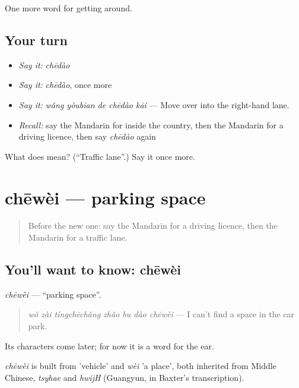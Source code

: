 \begin{grammarlens}[title={What you've built}]
One more word for getting around.
\end{grammarlens}

\subsection*{Your turn}
\begin{itemize}
\raggedright
  \item \emph{Say it:} \emph{chēdào}
  \item \emph{Say it:} \emph{chēdào}, once more
  \item \emph{Say it:} \emph{wǎng yòubian de chēdào kāi} — Move over into the right-hand lane.
  \item \emph{Recall:} say the Mandarin for inside the country, then the Mandarin for a driving licence, then say \emph{chēdào} again
\end{itemize}

\begin{tcolorbox}[breakable,colback=teal!4,colframe=teal!35!black,title={Before you move on}]
What does  mean? (\textquotedblleft{}Traffic lane\textquotedblright{}.) Say it once more.
\end{tcolorbox}
\section[chēwèi]{chēwèi — parking space}

\label{lesson:ZH-C420-chewei}



\begin{quote}
Before the new one: say the Mandarin for a driving licence, then the Mandarin for a traffic lane.
\end{quote}

\subsection*{You'll want to know: chēwèi}
\emph{chēwèi} — \textquotedblleft{}parking space\textquotedblright{}.

\begin{quote}
\emph{wǒ zài tíngchēchǎng zhǎo bu dào chēwèi} — I can't find a space in the car park.
\end{quote}

Its characters come later; for now it is a word for the ear.

\begin{cousinweb}
\emph{chēwèi} is built from  'vehicle' and \emph{wèi} 'a place', both inherited from Middle Chinese, \emph{tsyhae} and \emph{hwijH} (Guangyun, in Baxter's transcription).
\end{cousinweb}

